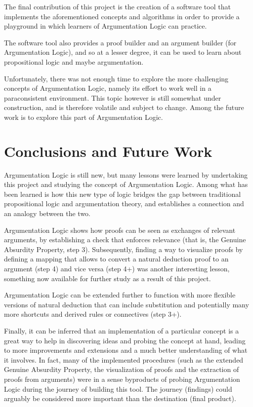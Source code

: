 \documentclass[11pt,twoside,a4paper]{report}
\begin{document}
The final contribution of this project is the creation of a software tool that implements the aforementioned concepts and algorithms in order to provide a playground in which learners of Argumentation Logic can practice. 

The software tool also provides a proof builder and an argument builder (for Argumentation Logic), and so at a lesser degree, it can be used to learn about propositional logic and maybe argumentation.

Unfortunately, there was not enough time to explore the more challenging concepts of Argumentation Logic, namely its effort to work well in a paraconsistent environment. This topic however is still somewhat under construction, and is therefore volatile and subject to change. Among the future work is to explore this part of Argumentation Logic.

\chapter{Conclusions and Future Work}
\label{chap:chiliconclusion}
Argumentation Logic is still new, but many lessons were learned by undertaking this project and studying the concept of Argumentation Logic. Among what has been learned is how this new type of logic bridges the gap between traditional propositional logic and argumentation theory, and establishes a connection and an analogy between the two.

Argumentation Logic shows how proofs can be seen as exchanges of relevant arguments, by establishing a check that enforces relevance (that is, the Genuine Absurdity Property, step 3). Subsequently, finding a way to visualize proofs by defining a mapping that allows to convert a natural deduction proof to an argument (step 4) and vice versa (step 4+) was another interesting lesson, something now available for further study as a result of this project.

Argumentation Logic can be extended further to function with more flexible versions of natural deduction that can include substitution and potentially many more shortcuts and derived rules or connectives (step 3+).

Finally, it can be inferred that an implementation of a particular concept is a great way to help in discovering ideas and probing the concept at hand, leading to more improvements and extensions and a much better understanding of what it involves. In fact, many of the implemented procedures (such as the extended Genuine Absurdity Property, the visualization of proofs and the extraction of proofs from arguments) were in a sense byproducts of probing Argumentation Logic during the journey of building this tool. The journey (findings) could arguably be considered more important than the destination (final product).
\end{document}
